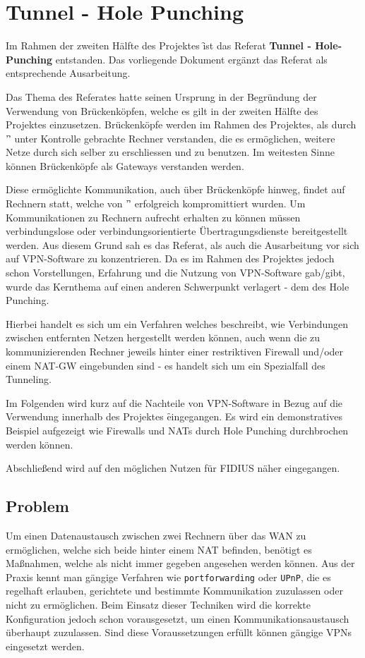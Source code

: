 \section{Tunnel - Hole Punching}
\label{composition:tunnel} Im Rahmen der zweiten Hälfte des Projektes
\f ist das Referat \textbf{Tunnel - Hole-Punching} entstanden.
Das vorliegende Dokument ergänzt das Referat als entsprechende
Ausarbeitung.

Das Thema des Referates hatte seinen Ursprung in der Begründung der
Verwendung von Brückenköpfen, welche es gilt in der zweiten Hälfte des
Projektes einzusetzen. Brückenköpfe werden im Rahmen des Projektes,
als durch '\f' unter Kontrolle gebrachte Rechner verstanden, die
es ermöglichen, weitere Netze durch sich selber zu erschliessen und zu
benutzen. Im weitesten Sinne können Brückenköpfe als Gateways
verstanden werden.

Diese ermöglichte Kommunikation, auch über Brückenköpfe hinweg, findet
auf Rechnern statt, welche von '\f' erfolgreich kompromittiert
wurden. Um Kommunikationen zu Rechnern aufrecht erhalten zu können
müssen verbindungslose oder verbindungsorientierte Übertragungsdienste
bereitgestellt werden. Aus diesem Grund sah es das Referat, als auch
die Ausarbeitung vor sich auf VPN-Software zu konzentrieren. Da es im
Rahmen des Projektes jedoch schon Vorstellungen, Erfahrung und die
Nutzung von VPN-Software gab/gibt, wurde das Kernthema auf einen
anderen Schwerpunkt verlagert - dem des Hole Punching.

Hierbei handelt es sich um ein Verfahren welches beschreibt, wie
Verbindungen zwischen entfernten Netzen hergestellt werden können,
auch wenn die zu kommunizierenden Rechner jeweils hinter einer
restriktiven Firewall und/oder einem NAT-GW eingebunden sind - es
handelt sich um ein Spezialfall des Tunneling.

Im Folgenden wird kurz auf die Nachteile von VPN-Software in Bezug auf
die Verwendung innerhalb des Projektes \f eingegangen.  Es wird
ein demonstratives Beispiel aufgezeigt wie Firewalls und NATs durch
Hole Punching durchbrochen werden können.

Abschließend wird auf den möglichen Nutzen für FIDIUS näher
eingegangen.

\subsection{Problem} Um einen Datenaustausch zwischen zwei Rechnern
über das WAN zu ermöglichen, welche sich beide hinter einem NAT
befinden, benötigt es Maßnahmen, welche als nicht immer gegeben
angesehen werden können. Aus der Praxis kennt man gängige Verfahren
wie \texttt{portforwarding} oder \texttt{UPnP}, die es regelhaft
erlauben, gerichtete und bestimmte Kommunikation zuzulassen oder nicht
zu ermöglichen. Beim Einsatz dieser Techniken wird die korrekte
Konfiguration jedoch schon vorausgesetzt, um einen
Kommunikationsaustausch überhaupt zuzulassen.  Sind diese
Voraussetzungen erfüllt können gängige VPNs eingesetzt werden.
